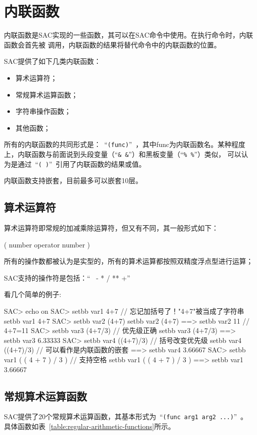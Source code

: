 \section{内联函数}

内联函数是SAC实现的一些函数，其可以在SAC命令中使用。在执行命令时，内联函数会首先被
调用，内联函数的结果将替代命令中的内联函数的位置。

SAC提供了如下几类内联函数：
\begin{itemize}
\item 算术运算符；
\item 常规算术运算函数；
\item 字符串操作函数；
\item 其他函数；
\end{itemize}

所有的内联函数的共同形式是：~``\verb+(func)+''~，其中func为内联函数名。某种程度
上，内联函数与前面说到头段变量（``\verb+& &+''）和黑板变量（``\verb+% %+''）类似，
可以认为是通过~``\verb+( )+''~引用了内联函数的结果或值。

内联函数支持嵌套，目前最多可以嵌套10层。

\subsection{算术运算符}
算术运算符即常规的加减乘除运算符，但又有不同，其一般形式如下：
\begin{SACCode}
    ( number operator number )
\end{SACCode}
所有的操作数都被认为是实型的，所有的算术运算都按照双精度浮点型进行运算；

SAC支持的操作符是包括：``\verb+ +  -  *  /  ** +''

看几个简单的例子:
\begin{SACCode}
SAC> echo on
SAC> setbb var1 4+7             // 忘记加括号了！"4+7"被当成了字符串
 setbb var1 4+7
SAC> setbb var2 (4+7)
 setbb var2 (4+7)
 ==>  setbb var2 11             // 4+7=11
SAC> setbb var3 (4+7/3)         // 优先级正确
 setbb var3 (4+7/3)
 ==>  setbb var3 6.33333
SAC> setbb var4 ((4+7)/3)       // 括号改变优先级
 setbb var4 ((4+7)/3)           // 可以看作是内联函数的嵌套
 ==>  setbb var4 3.66667
SAC> setbb var1 ( ( 4 + 7 ) / 3 )   // 支持空格
 setbb var1 ( ( 4 + 7 ) / 3 )
 ==>  setbb var1 3.66667
\end{SACCode}

\subsection{常规算术运算函数}
SAC提供了20个常规算术运算函数，其基本形式为~``\verb+(func arg1 arg2 ...)+''~。
具体函数如表~\ref{table:regular-arithmetic-functions}所示。

